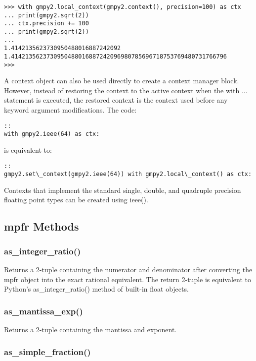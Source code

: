 \begin{lstlisting}
>>> with gmpy2.local_context(gmpy2.context(), precision=100) as ctx
... print(gmpy2.sqrt(2))
... ctx.precision += 100
... print(gmpy2.sqrt(2))
...
1.4142135623730950488016887242092
1.4142135623730950488016887242096980785696718753769480731766796
>>>
\end{lstlisting}

A context object can also be used directly to create a context manager block. However,
instead of restoring the context to the active context when the with ... statement is
executed, the restored context is the context used before any keyword argument
modifications.
The code:

\begin{lstlisting}
::
with gmpy2.ieee(64) as ctx:
\end{lstlisting}

is equivalent to:

\begin{lstlisting}
::
gmpy2.set\_context(gmpy2.ieee(64)) with gmpy2.local\_context() as ctx:
\end{lstlisting}

Contexts that implement the standard single, double, and quadruple precision floating point
types can be created using ieee().



\subsection{mpfr Methods}

\subsubsection{as\_integer\_ratio()}

Returns a 2-tuple containing the numerator and denominator after converting the mpfr object
into the exact rational equivalent. The return 2-tuple is equivalent to Python's as\_integer\_ratio()
method of built-in float objects.

\subsubsection{as\_mantissa\_exp()}

Returns a 2-tuple containing the mantissa and exponent.

\subsubsection{as\_simple\_fraction()}

